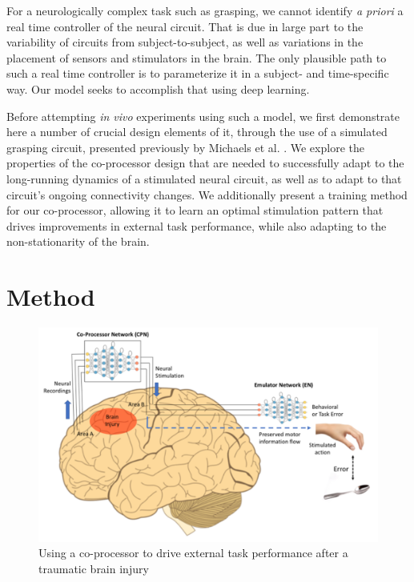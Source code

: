 \documentclass[12pt]{iopart}
\begin{document}
For a neurologically complex task such as grasping, we cannot identify
\textit{a priori} a real time controller of the neural circuit. That is
due in large part to the variability of circuits from subject-to-subject,
as well as variations in the placement of sensors and stimulators in the
brain. The only plausible path to such a real time controller is to parameterize
it in a subject- and time-specific way. Our model seeks to accomplish that using
deep learning.

Before attempting \textit{in vivo} experiments using such a model, we first demonstrate
here a number of crucial design elements of it, through the use of a simulated
grasping circuit, presented previously by Michaels et al. \cite{michaels.mrnn}. We
explore the properties of the co-processor design that are needed to
successfully adapt to the long-running dynamics of a stimulated neural circuit,
as well as to adapt to that circuit's ongoing connectivity changes.
We additionally present a training method for our co-processor, allowing it to learn
an optimal stimulation pattern that drives improvements in external task performance,
while also adapting to the non-stationarity of the brain.

\section{Method}

\begin{figure}
\includegraphics[width=\textwidth]{weill_arch.png}
\caption{Using a co-processor to drive external task performance after a traumatic brain injury}
\centering
\label{fig:weill}
\end{figure}
\end{document}
